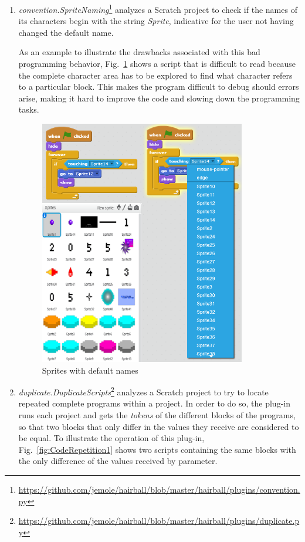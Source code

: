 \documentclass[conference]{format/IEEEtran}
\begin{document}
\begin{enumerate}

  \item \textit{convention.SpriteNaming}\footnote{\url{https://github.com/jemole/hairball/blob/master/hairball/plugins/convention.py}} analyzes a Scratch project to check if the names of its characters begin with the string \textit{Sprite}, indicative for the user not having changed the default name.

As an example to illustrate the drawbacks associated with this bad programming behavior, Fig.~\ref{fig:SpriteNaming} shows a script that is difficult to read because the complete character area has to be explored to find what character refers to a particular block. This makes the program difficult to debug should errors arise, making it hard to improve the code and slowing down the programming tasks. 

\begin{figure}
  \centering
    \includegraphics[width=9cm]{img/SpriteNaming.png}
  \caption{Sprites with default names}
  \label{fig:SpriteNaming}
\end{figure}

  \item \textit{duplicate.DuplicateScripts}\footnote{\url{https://github.com/jemole/hairball/blob/master/hairball/plugins/duplicate.py}} analyzes a Scratch project to try to locate repeated complete programs within a project. In order to do so, the plug-in runs each project and gets the \textit{tokens} of the different blocks of the programs, so that two blocks that only differ in the values they receive are considered to be equal. To illustrate the operation of this plug-in, Fig.~\ref{fig:CodeRepetition1} shows two scripts containing the same blocks with the only difference of the values received by parameter.



\end{enumerate}
\end{document}
